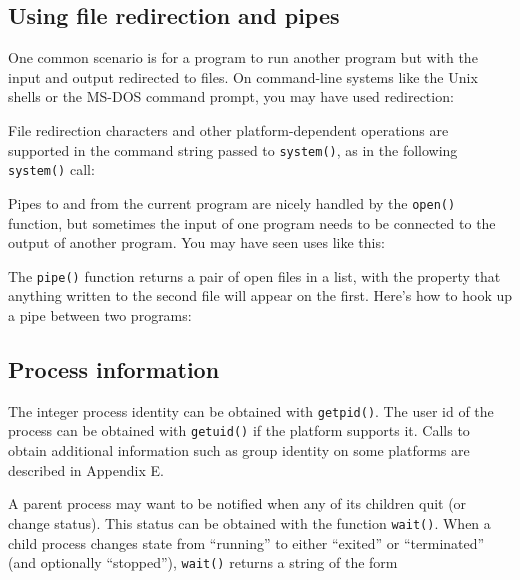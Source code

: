 \subsection*{Using file redirection and pipes}

One common scenario is for a program to run
another program but with the input and output redirected to files. On
command-line systems like the Unix shells or the MS-DOS command prompt,
you may have used redirection:


\noindent
File redirection characters and other platform-dependent operations are
supported in the command string passed to \texttt{system()}, as
in the following \texttt{system()} call:


Pipes to and from the current program are nicely handled by the
\texttt{open()} function, but sometimes the input of one program needs
to be connected to the output of another program. You may have seen
uses like this:


The \texttt{pipe()} function returns a pair of open files in a list,
with the property that anything written to the second file will appear
on the first. Here's how to hook up a pipe between two
programs:


\subsection*{Process information}

The integer process identity can be obtained with
\texttt{getpid()}. The user id of the process can be
obtained with \texttt{getuid()} if the platform
supports it. Calls to obtain additional information such as group
identity on some platforms are described in Appendix E.

A parent process may want to be notified when any of its children quit
(or change status). This status can be obtained with the function
\texttt{wait()}. When a child process changes state from
``running'' to either
``exited'' or
``terminated'' (and optionally
``stopped''), \texttt{wait()} returns a
string of the form

